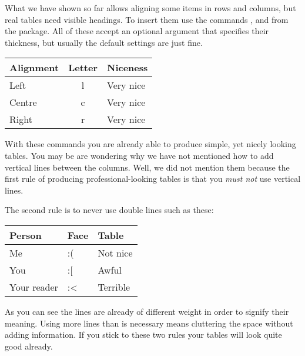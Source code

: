 What we have shown so far allows aligning some items in rows and columns,
but real tables need visible headings. To insert them use the commands
,  and  from the  package.
All of these accept an optional argument that specifies their thickness, but
usually the default settings are just fine.
\begin{example}[examplewidth=0.43\linewidth]
\begin{tabular}{lcl}
  \toprule
  Alignment & Letter & Niceness  \\
  \midrule
  Left      & l      & Very nice \\
  Centre     & c      & Very nice \\
  Right     & r      & Very nice \\
  \bottomrule
\end{tabular}
\end{example}

With these commands you are already able to produce simple, yet nicely looking
tables. You may be are wondering why we have not mentioned how to add vertical
lines between the columns. Well, we did not mention them because the first rule
of producing professional-looking tables is that you \emph{must not} use
vertical lines.

The second rule is to never use double lines such as these:
\begin{example}[examplewidth=0.43\linewidth]
\begin{tabular}{lll}
  \toprule[0.1cm]
  \toprule
  Person      & Face & Table    \\
  \midrule
  \midrule
  Me          & :(   & Not nice \\
  You         & :[   & Awful    \\
  Your reader & :<   & Terrible \\
  \bottomrule
  \bottomrule[0.1cm]
\end{tabular}
\end{example}
As you can see the lines are already of different weight in order to signify
their meaning. Using more lines than is necessary means cluttering the space
without adding information. If you stick to these two rules your tables will
look quite good already.

